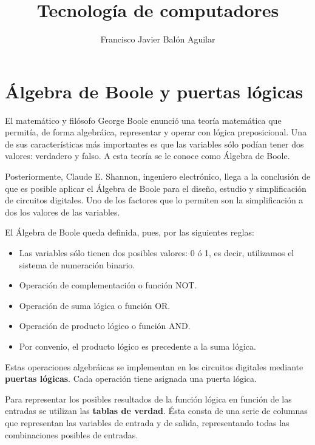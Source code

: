 \documentclass[a4paper, 11pt, titlepage]{article}
\title{Tecnología de computadores}
\author{Francisco Javier Balón Aguilar}
\begin{document}
\maketitle
\renewcommand{\contentsname}{Índice}
\tableofcontents
\newpage

\section{Álgebra de Boole y puertas lógicas}

    El matemático y filósofo George Boole enunció una teoría matemática que permitía, de forma 
    algebráica, representar y operar con lógica preposicional. Una de sus características más 
    importantes es que las variables sólo podían tener dos valores: verdadero y falso. A esta 
    teoría se le conoce como Álgebra de Boole.

    Posteriormente, Claude E. Shannon, ingeniero electrónico, llega a la conclusión de que 
    es posible aplicar el Álgebra de Boole para el diseño, estudio y simplificación de circuitos 
    digitales. Uno de los factores que lo permiten son la simplificación a dos los valores de 
    las variables.

    El Álgebra de Boole queda definida, pues, por las siguientes reglas:

    \begin{itemize}
        \item Las variables sólo tienen dos posibles valores: 0 ó 1, es decir, utilizamos el 
        sistema de numeración binario.
        \item Operación de complementación o función NOT.
        \item Operación de suma lógica o función OR.
        \item Operación de producto lógico o función AND.
        \item Por convenio, el producto lógico es precedente a la suma lógica.
    \end{itemize}

    Estas operaciones algebráicas se implementan en los circuitos digitales mediante \textbf{puertas 
    lógicas}. Cada operación tiene asignada una puerta lógica.


    Para representar los posibles resultados de la función lógica en función de las entradas se 
    utilizan las \textbf{tablas de verdad}. Ésta consta de una serie de columnas que representan 
    las variables de entrada y de salida, representando todas las combinaciones posibles de entradas.
\end{document}
